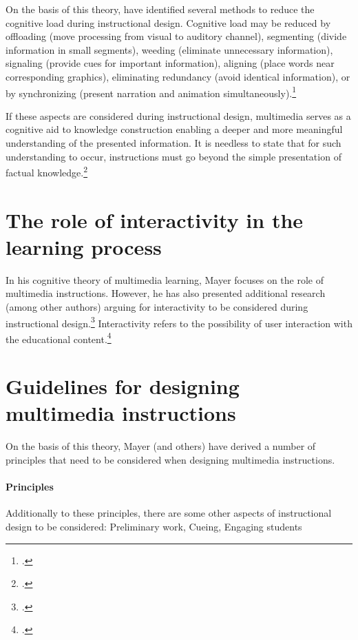 On the basis of this theory, \cite{MayerNineWaysReduce2003} have identified several methods to reduce the cognitive load during instructional design. Cognitive load may be reduced by offloading (move processing from visual to auditory channel), segmenting (divide information in small segments), weeding (eliminate unnecessary information), signaling (provide cues for important information), aligning (place words near corresponding graphics), eliminating redundancy (avoid identical information), or by synchronizing (present narration and animation simultaneously).\footcites[Cf.][p.46]{MayerNineWaysReduce2003}

If these aspects are considered during instructional design, multimedia serves as a cognitive aid to knowledge construction enabling a deeper and more meaningful understanding of the presented information. It is needless to state that for such understanding to occur, instructions must go beyond the simple presentation of factual knowledge.\footcites[Cf.][p.229]{MayerRotemeaningfullearning2002}

\section{The role of interactivity in the learning process}
In his cognitive theory of multimedia learning, Mayer focuses on the role of multimedia instructions. However, he has also presented additional research (among other authors) arguing for interactivity to be considered during instructional design.\footcites[Cf.][chapter 2, paragraph 12]{ClarkElearningscienceinstruction2016} Interactivity refers to the possibility of user interaction with the educational content.\footcites[Cf.][p.292]{PatwardhanWhendoeshigher2015} 



\section{Guidelines for designing multimedia instructions}
On the basis of this theory, Mayer (and others) have derived a number of principles that need to be considered when designing multimedia instructions. 

\paragraph{Principles}


Additionally to these principles, there are some other aspects of instructional design to be considered: Preliminary work, Cueing, Engaging students 


